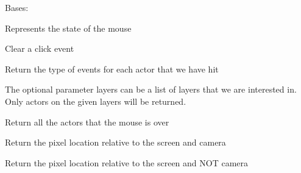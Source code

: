 \documentclass[letterpaper,10pt,english]{sphinxmanual}
\begin{document}
\begin{fulllineitems}
\label{input:serge.input.Mouse}
Bases: 

Represents the state of the mouse

\begin{fulllineitems}
\label{input:serge.input.Mouse.clearClick}
Clear a click event

\end{fulllineitems}


\begin{fulllineitems}
\label{input:serge.input.Mouse.getActorEvents}
Return the type of events for each actor that we have hit

The optional parameter layers can be a list of layers that we are interested in. Only
actors on the given layers will be returned.

\end{fulllineitems}


\begin{fulllineitems}
\label{input:serge.input.Mouse.getActorsUnderMouse}
Return all the actors that the mouse is over

\end{fulllineitems}


\begin{fulllineitems}
\label{input:serge.input.Mouse.getScreenPos}
Return the pixel location relative to the screen and camera

\end{fulllineitems}


\begin{fulllineitems}
\label{input:serge.input.Mouse.getStaticScreenPos}
Return the pixel location relative to the screen and NOT camera


\end{fulllineitems}
\end{fulllineitems}
\end{document}
